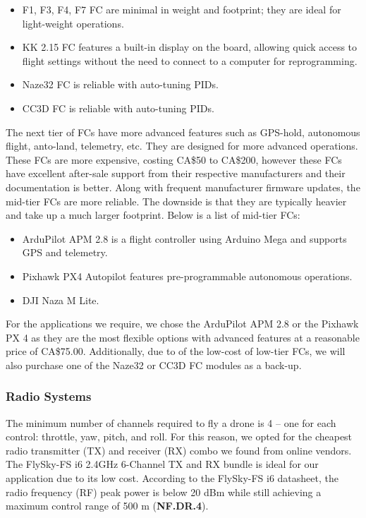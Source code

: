 \begin{itemize}[noitemsep,topsep=0pt, parsep=4pt, partopsep=0pt]
    \item F1, F3, F4, F7 FC are minimal in weight and footprint; they are ideal for light-weight operations.\cite{f1fc}
    \item KK 2.15 FC features a built-in display on the board, allowing quick access to flight settings without the need to connect to a computer for reprogramming.
    \item Naze32 FC is reliable with auto-tuning PIDs.
    \item CC3D FC is reliable with auto-tuning PIDs.
\end{itemize}

The next tier of FCs have more advanced features such as GPS-hold, autonomous flight, anto-land, telemetry, etc. They are designed for more advanced operations. These FCs are more expensive, costing CA\$50 to CA\$200, however these FCs have excellent after-sale support from their respective 
manufacturers and their documentation is better. Along 
with frequent manufacturer firmware updates, the mid-tier FCs are more reliable. The downside is that 
they are typically heavier and take up a much larger footprint. 
Below is a list of mid-tier FCs:

\begin{itemize}[noitemsep,topsep=0pt, parsep=4pt, partopsep=0pt]
    \item ArduPilot APM 2.8 is a flight controller using Arduino Mega and supports GPS and telemetry.
    \item Pixhawk PX4 Autopilot features pre-programmable autonomous operations.
    \item DJI Naza M Lite.
\end{itemize}

For the applications we require, we chose the ArduPilot APM 2.8 or the Pixhawk PX 4 as they are the most flexible options with advanced features at a reasonable price of CA\$75.00. Additionally, due to of the low-cost of low-tier FCs, we will also purchase one of the Naze32 or CC3D FC modules as a back-up.

\subsubsection{Radio Systems}

The minimum number of channels required to fly a drone is 4 -- one for each control: throttle, yaw, 
pitch, and roll. For this reason, we opted for the cheapest radio transmitter (TX) and receiver  (RX) 
combo we found from online vendors. 
The FlySky-FS i6 2.4GHz 6-Channel TX and RX bundle is ideal for our application due to its low cost.
According to the FlySky-FS i6 datasheet\cite{flyskyi6}, the radio frequency (RF) peak power is below 20 dBm while still achieving a maximum control range of 500 m (\textbf{NF.DR.4}).

